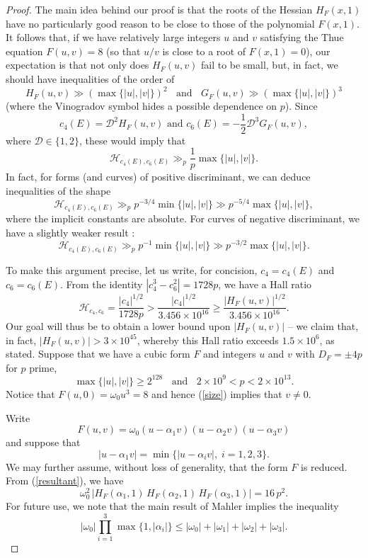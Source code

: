 \begin{proof}
The main idea behind our proof is that the roots of the Hessian $H_F(x,1)$ have no particularly good reason to be close to those of the polynomial $F(x,1)$. It follows that, if we have relatively large integers $u$ and $v$ satisfying the Thue equation $F(u,v)=8$ (so that $u/v$ is close to a root of $F(x,1)=0$), our expectation is that not only does $H_F(u,v)$ fail to be small, but, in fact, we should have inequalities of the order of
$$
H_F(u,v) \gg \left( \max\{|u|,|v|\} \right)^2 \; \; \mbox{ and } \; \; G_F(u,v) \gg \left( \max\{|u|,|v|\} \right)^3
$$
(where the Vinogradov symbol hides a possible dependence on $p$).
Since
$$
c_4(E) = \mathcal{D}^2 H_{F} (u,v) \mbox{ and }  c_6(E) = - \frac{1}{2}  \mathcal{D}^3 G_{F} (u,v),
$$
where $\mathcal{D} \in \{ 1, 2 \}$, these would imply that
$$
\mathcal{H}_{c_4(E),c_6(E)} \gg_p \frac{1}{p}  \max\{|u|,|v|\}.
$$
In fact, for forms (and curves) of positive discriminant, we can deduce inequalities of the shape
$$
\mathcal{H}_{c_4(E),c_6(E)} \gg_p p^{-3/4}  \min\{|u|,|v|\} \gg p^{-5/4}  \max\{|u|,|v|\},
$$
where the implicit constants are absolute. For curves of negative discriminant, we have a slightly weaker result :
$$
\mathcal{H}_{c_4(E),c_6(E)} \gg_p p^{-1}  \min\{|u|,|v|\} \gg p^{-3/2}  \max\{|u|,|v|\}.
$$

To make this argument precise, let us write, for concision, $c_4=c_4(E)$ and $c_6=c_6(E)$.  From the identity $|c_4^3-c_6^2|=1728p$, we have a Hall ratio 
$$
\mathcal{H}_{c_4,c_6} = \frac{|c_4|^{1/2}}{1728p} > \frac{|c_4|^{1/2}}{3.456 \times 10^{16}} \geq \frac{|H_F(u,v)|^{1/2}}{3.456 \times 10^{16}}.
$$
Our goal will thus be to obtain a lower bound upon $|H_{F} (u,v)|$ --
we claim that, in fact, $|H_{F} (u,v)| > 3 \times 10^{45}$, whereby this Hall ratio exceeds $1.5 \times 10^6$, as stated. Suppose that we have a cubic form $F$ and integers $u$ and $v$ with
 $D_F = \pm 4 p$ for $p$ prime,
\begin{equation} \label{size}
\max \{ |u|, |v| \} \geq 2^{128} \; \; \mbox{ and } \; \; 2 \times 10^{9} < p < 2 \times 10^{13}.
\end{equation}
Notice that $F(u,0) = \omega_0 u^3 = 8$ and hence (\ref{size}) implies that $v \neq 0$.

Write
$$
F(u,v) = \omega_0 (u -\alpha_1 v) (u-\alpha_2v) (u-\alpha_3v)
$$
and suppose that 
$$
|u - \alpha_1 v| = \min \{ |u-\alpha_iv|, \; i = 1, 2, 3 \}.
$$
We may further assume, without loss of generality, that the form $F$ is reduced. From (\ref{resultant}), we have 
\begin{equation} \label{rezzie}
\omega_0^2 \, \left|  H_F (\alpha_1,1) \, H_F (\alpha_2,1) \, H_F (\alpha_3,1) \right|=  16 \, p^2.
\end{equation}
For future use, we note that  the main result of Mahler \cite{Mah0} implies the inequality
\begin{equation} \label{Mahler}
|\omega_0| \prod_{i=1}^{3} \max \{ 1, |\alpha_i| \} \leq |\omega_0|+|\omega_1|+|\omega_2|+|\omega_3|.
\end{equation}


\end{proof}
